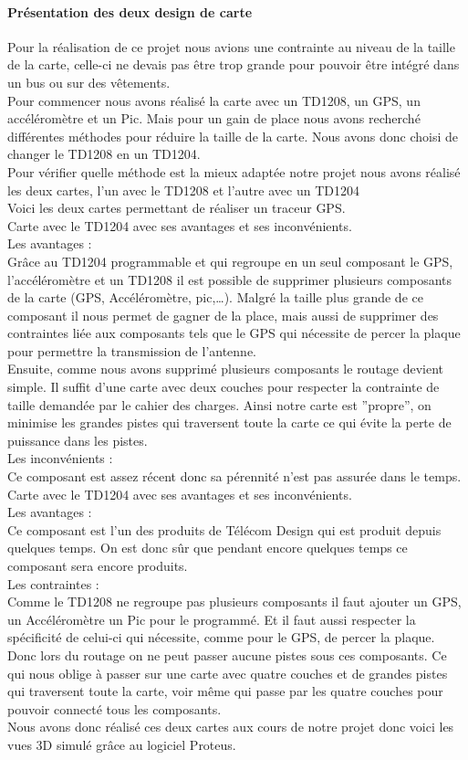 \documentclass[10pt,a4paper]{article}
\begin{document}
\paragraph{Présentation des deux design de carte}
Pour la réalisation de ce projet nous avions une contrainte au niveau de la taille de la carte, celle-ci ne devais pas être trop grande pour pouvoir être intégré dans un bus ou sur des vêtements.\\
Pour commencer nous avons réalisé la carte avec un TD1208, un GPS, un accéléromètre et un Pic.
Mais pour un gain de place nous avons recherché différentes méthodes pour réduire la taille de la carte. Nous avons donc choisi de changer le TD1208 en un TD1204.\\ 
 Pour vérifier quelle méthode est la mieux adaptée notre projet nous avons réalisé les deux cartes, l'un avec le TD1208 et l'autre avec un TD1204\\ Voici les deux cartes permettant de réaliser un traceur GPS. \\Carte avec le TD1204 avec ses avantages et ses inconvénients. \\Les avantages : \\Grâce au TD1204 programmable et qui regroupe en un seul composant le GPS, l'accéléromètre et un TD1208 il est possible de supprimer plusieurs composants de la carte (GPS, Accéléromètre, pic,…). Malgré la taille plus grande de ce composant il nous permet de gagner de la place, mais aussi de supprimer des contraintes liée aux composants tels que le GPS qui nécessite de percer la plaque pour permettre la transmission de l'antenne. \\Ensuite, comme nous avons supprimé plusieurs composants le routage devient simple. Il suffit d'une carte avec deux couches pour respecter la contrainte de taille demandée par le cahier des charges. Ainsi notre carte est  ''propre'', on minimise les grandes pistes qui traversent toute la carte ce qui évite la perte de puissance dans les pistes.\\Les inconvénients :\\Ce composant est assez récent donc sa pérennité n'est pas assurée dans le temps.  
Carte avec le TD1204 avec ses avantages et ses inconvénients. \\Les avantages :\\Ce composant est l'un des produits de Télécom Design qui est produit depuis quelques temps. On est donc sûr que pendant encore quelques temps ce composant sera encore produits.\\ Les contraintes :\\Comme le TD1208 ne regroupe pas plusieurs composants il faut ajouter un GPS, un Accéléromètre un Pic pour le programmé.  Et il faut aussi respecter la spécificité de celui-ci qui nécessite, comme pour le GPS, de percer la plaque. Donc lors du routage on ne peut passer aucune pistes sous ces composants. Ce qui nous oblige à passer sur une carte avec quatre couches et de grandes pistes qui traversent toute la carte, voir même qui passe par les quatre couches pour pouvoir connecté tous les composants. \\Nous avons donc réalisé ces deux cartes aux cours de notre projet donc voici les vues 3D simulé grâce au logiciel Proteus. \\
\end{document}
